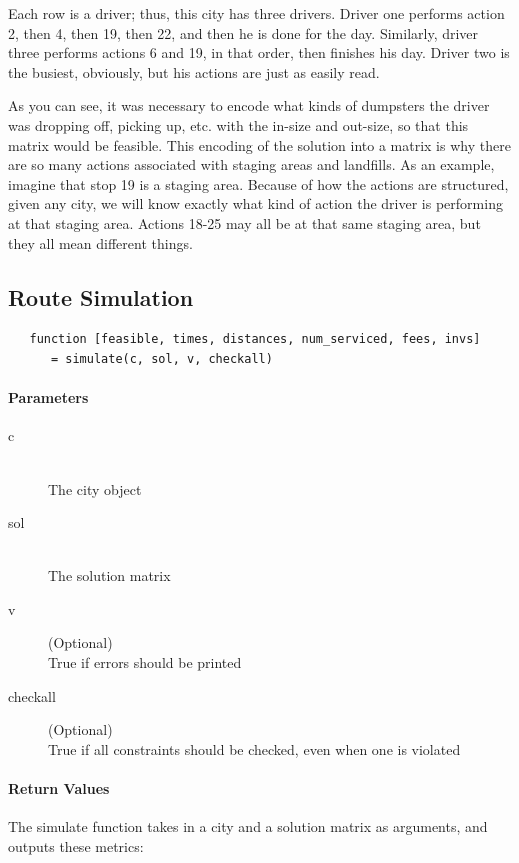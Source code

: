 \documentclass{article}
\begin{document}
\vspace{5mm}


Each row is a driver; thus, this city has three drivers.
Driver one performs action 2, then 4, then 19, then 22, and then he is done for the day.
Similarly, driver three performs actions 6 and 19, in that order, then finishes his day.  
Driver two is the busiest, obviously, but his actions are just as easily read.

As you can see, it was necessary to encode what kinds of dumpsters the driver was dropping off, picking up, etc. with the in-size and out-size, so that this matrix would be feasible. 
This encoding of the solution into a matrix is why there are so many actions associated with staging areas and landfills.
As an example, imagine that stop 19 is a staging area. 
Because of how the actions are structured, given any city, we will know exactly what kind of action the driver is performing at that staging area. 
Actions 18-25 may all be at that same staging area, but they all mean different things.


\subsection{Route Simulation}

\begin{verbatim}
   function [feasible, times, distances, num_serviced, fees, invs] 
      = simulate(c, sol, v, checkall)
\end{verbatim}

\paragraph{Parameters}
\begin{description}
\item[c] \hfill \\ The city object
\item[sol] \hfill \\ The solution matrix
\item[v] (Optional)\hfill \\   True if errors should be printed
\item[checkall] (Optional)\hfill \\  True if all constraints should be checked, even when one is violated
\end{description}

\paragraph{Return Values}
The simulate function takes in a city and a solution matrix as arguments, and outputs these metrics:
\end{document}
